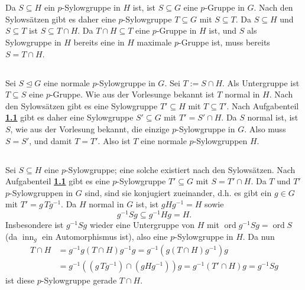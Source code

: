 \documentclass[a4paper,10pt]{article}
\theoremstyle{definition}
\newcommand{\ord}{\operatorname{ord}}
\newcommand{\inn}{\operatorname{inn}}
\begin{document}
\section{}


\subsection{}\label{ssc:Sylowschnitt}
Da $S \subseteq H$ ein $p$-Sylowgruppe in $H$ ist, ist $S \subseteq G$ eine $p$-Gruppe in $G$. Nach den Sylowsätzen gibt es daher eine $p$-Sylowgruppe $T \subseteq G$ mit $S \subseteq T$. Da $S \subseteq H$ und $S \subseteq T$ ist $S \subseteq T \cap H$. Da $T \cap H \subseteq T$ eine $p$-Gruppe in $H$ ist, und $S$ als Sylowgruppe in $H$ bereits eine in $H$ maximale $p$-Gruppe ist, muss bereits $S = T \cap H$.


\subsection{}
Sei $S \trianglelefteq G$ eine normale $p$-Sylowgruppe in $G$. Sei $T := S \cap H$. Als Untergruppe ist $T \subseteq S$ eine $p$-Gruppe. Wie aus der Vorlesunge bekannt ist $T$ normal in $H$. Nach den Sylowsätzen gibt es eine Sylowgruppe $T' \subseteq H$ mit $T \subseteq T'$. Nach Aufgabenteil \textbf{\ref{ssc:Sylowschnitt}} gibt es daher eine Sylowgruppe $S' \subseteq G$ mit $T' = S' \cap H$. Da $S$ normal ist, ist $S$, wie aus der Vorlesung bekannt, die einzige $p$-Sylowgruppe in $G$. Also muss $S = S'$, und damit $T = T'$. Also ist $T$ eine normale $p$-Sylowgruppen $H$.


\subsection{}
Sei $S \subseteq H$ eine $p$-Sylowgruppe; eine solche existiert nach den Sylowsätzen. Nach Aufgabenteil \textbf{\ref{ssc:Sylowschnitt}} gibt es eine $p$-Sylowgruppe $T' \subseteq G$ mit $S = T' \cap H$. Da $T$ und $T'$ $p$-Sylowgruppen in $G$ sind, sind sie konjugiert zueinander, d.h. es gibt ein $g \in G$ mit $T' = g\, T g^{-1}$. Da $H$ normal in $G$ ist, ist $gHg^{-1} = H$ sowie
\[
 g^{-1}Sg \subseteq g^{-1}Hg = H.
\]
Insbesondere ist $g^{-1}Sg$ wieder eine Untergruppe von $H$ mit $\ord g^{-1}Sg = \ord S$ (da $\inn_g$ ein Automorphismus ist), also eine $p$-Sylowgruppe in $H$. Da nun
\begin{align*}
 T \cap H
 &= g^{-1}g(T \cap H)g^{-1}g
 = g^{-1} \left( g(T \cap H)g^{-1} \right) g \\
 &= g^{-1} \left( \left(g\,Tg^{-1}\right) \cap \left(gHg^{-1}\right) \right) g
 = g^{-1} (T' \cap H) g
 = g^{-1} S g
\end{align*}
ist diese $p$-Sylowgruppe gerade $T \cap H$.
\end{document}

